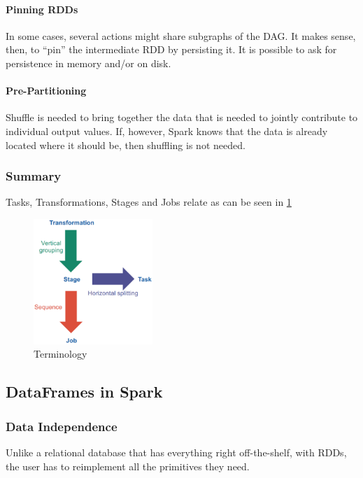 \paragraph{Pinning RDDs}
In some cases, several actions might share subgraphs of the DAG. It makes sense, then, to “pin” the intermediate RDD by persisting it. It is possible to ask for persistence in memory and/or on disk.

\paragraph{Pre-Partitioning}
Shuffle is needed to bring together the data that is needed to jointly contribute to individual output values. If, however, Spark knows that the data is already located where it should be, then shuffling is not needed.

\subsubsection{Summary}
Tasks, Transformations, Stages and Jobs relate as can be seen in \cref{fig:Terminology}

\begin{figure}[h]
    \centering
    \includegraphics[width=0.4\textwidth]{Figures/Terminology.jpeg}
    \caption{Terminology}\label{fig:Terminology}
\end{figure}


\subsection{DataFrames in Spark}

\subsubsection{Data Independence}
Unlike a relational database that has everything right off-the-shelf, with RDDs, the user has to reimplement all the primitives they need.

